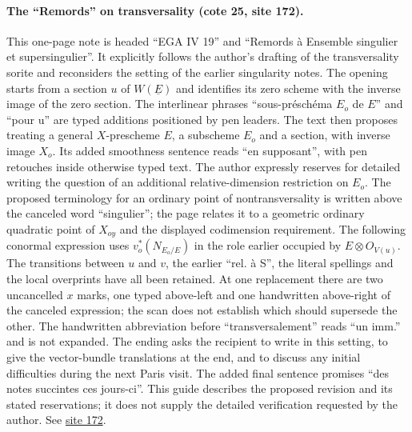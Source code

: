 \documentclass[10pt,a4paper]{article}
\begin{document}
\par{}
\paragraph{The ``Remords'' on transversality (cote 25, site 172).}
This one-page note is headed ``EGA IV 19'' and ``Remords à Ensemble singulier et supersingulier''. It explicitly follows the author's drafting of the transversality sorite and reconsiders the setting of the earlier singularity notes. The opening starts from a section $u$ of $W(\underline E)$ and identifies its zero scheme with the inverse image of the zero section. The interlinear phrases ``sous-préschéma $E_o$ de $E$'' and ``pour u'' are typed additions positioned by pen leaders. The text then proposes treating a general $X$-prescheme $E$, a subscheme $E_o$ and a section, with inverse image $X_o$. Its added smoothness sentence reads ``en supposant'', with pen retouches inside otherwise typed text. The author expressly reserves for detailed writing the question of an additional relative-dimension restriction on $E_o$. The proposed terminology for an ordinary point of nontransversality is written above the canceled word ``singulier''; the page relates it to a geometric ordinary quadratic point of $X_{oy}$ and the displayed codimension requirement. The following conormal expression uses $v_o^*(N_{E_o/E})$ in the role earlier occupied by $E\otimes O_{V(u)}$. The transitions between $u$ and $v$, the earlier ``rel. à S'', the literal spellings and the local overprints have all been retained. At one replacement there are two uncancelled $x$ marks, one typed above-left and one handwritten above-right of the canceled expression; the scan does not establish which should supersede the other. The handwritten abbreviation before ``transversalement'' reads ``un imm.'' and is not expanded. The ending asks the recipient to write in this setting, to give the vector-bundle translations at the end, and to discuss any initial difficulties during the next Paris visit. The added final sentence promises ``des notes succintes ces jours-ci''. This guide describes the proposed revision and its stated reservations; it does not supply the detailed verification requested by the author. See \href{https://grothendieck.umontpellier.fr/web/viewer.html?file=../25.pdf#page=173}{site 172}.
\par{}
\end{document}
